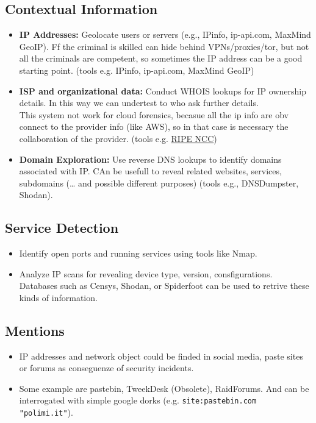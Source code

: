 \subsection{Contextual Information}
\begin{itemize}
    \item \textbf{IP Addresses:} Geolocate users or servers (e.g., IPinfo, ip-api.com, MaxMind GeoIP). Ff the criminal is skilled can hide behind VPNs/proxies/tor, but not all the criminals are competent, so sometimes the IP address can be a good starting point. (tools e.g. IPinfo, ip-api.com, MaxMind GeoIP)
    \item \textbf{ISP and organizational data:} Conduct WHOIS lookups for IP ownership details. In this way we can undertest to who ask further details. \\ This system not work for cloud forensics, becasue all the ip info are obv connect to the provider info (like AWS), so in that case is necessary the collaboration of the provider. (tools e.g. \href{https://apps.db.ripe.net/db-web-ui/query?bflag=false&dflag=false&rflag=true&searchtext=130.192.0.0%2F16&source=RIPE}{RIPE NCC})
    \item \textbf{Domain Exploration:} Use reverse DNS lookups to identify domains associated with IP. CAn be usefull to reveal related websites, services, subdomains (… and possible different purposes) (tools e.g., DNSDumpster, Shodan).
\end{itemize}

\subsection{Service Detection}
\begin{itemize}
    \item Identify open ports and running services using tools like Nmap.
    \item Analyze IP scans for revealing device type, version, consfigurations. \\ Databases such as Censys, Shodan, or Spiderfoot can be used to retrive these kinds of information.
\end{itemize}

\subsection{Mentions}
\begin{itemize}
    \item IP addresses and network object could be finded in social media, paste sites or forums as conseguenze of security incidents.
    \item Some example are pastebin, TweekDesk (Obsolete), RaidForums. And can be interrogated with simple google dorks (e.g. \texttt{site:pastebin.com "polimi.it"}).
\end{itemize}

